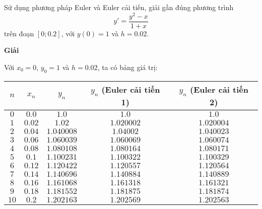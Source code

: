 \begin{example}
	Sử dụng phương pháp Euler và Euler cải tiến, giải gần đúng phương trình $$y'=\frac{y^2-x}{1+x}$$
	trên đoạn $[0;0.2]$, với $y(0)=1$ và $h=0.02$.
\end{example}
\textbf{Giải}\par
Với $x_0=0$, $y_0=1$ và $h=0.02$, ta có bảng giá trị:
\begin{center}\begin{tabular}{|c|c|c|c|c|}\hline
	$n$  & $x_n$  & $y_n$      & $y_n$ (Euler cải tiến 1) & $y_n$ (Euler cải tiến 2) \\\hline
	$0$  & $0.0$  & $1.0$      & $1.0$      & $1.0$      \\\hline
	$1$  & $0.02$ & $1.02$     & $1.020002$ & $1.020004$ \\\hline
	$2$  & $0.04$ & $1.040008$ & $1.04002$  & $1.040023$ \\\hline
	$3$  & $0.06$ & $1.060039$ & $1.060069$ & $1.060074$ \\\hline
	$4$  & $0.08$ & $1.080108$ & $1.080164$ & $1.080171$ \\\hline
	$5$  & $0.1$  & $1.100231$ & $1.100322$ & $1.100329$ \\\hline
	$6$  & $0.12$ & $1.120422$ & $1.120557$ & $1.120564$ \\\hline
	$7$  & $0.14$ & $1.140696$ & $1.140884$ & $1.140889$ \\\hline
	$8$  & $0.16$ & $1.161068$ & $1.161318$ & $1.161321$ \\\hline
	$9$  & $0.18$ & $1.181552$ & $1.181875$ & $1.181874$ \\\hline
	$10$ & $0.2$  & $1.202163$ & $1.202569$ & $1.202563$ \\\hline
\end{tabular}\end{center}